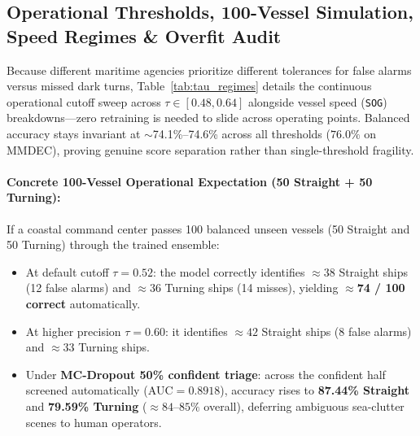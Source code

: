 \documentclass[11pt,a4paper]{article}
\begin{document}
\subsection{Operational Thresholds, 100-Vessel Simulation, Speed Regimes \& Overfit Audit}
Because different maritime agencies prioritize different tolerances for false alarms versus missed dark turns, Table~\ref{tab:tau_regimes} details the continuous operational cutoff sweep across $\tau \in [0.48, 0.64]$ alongside vessel speed (\texttt{SOG}) breakdowns---zero retraining is needed to slide across operating points. Balanced accuracy stays invariant at $\sim$74.1\%--74.6\% across all thresholds ($76.0\%$ on MMDEC), proving genuine score separation rather than single-threshold fragility.

\paragraph{Concrete 100-Vessel Operational Expectation (50 Straight + 50 Turning):}
If a coastal command center passes 100 balanced unseen vessels (50 Straight and 50 Turning) through the trained ensemble:
\begin{itemize}[leftmargin=1.5em]
    \item At default cutoff $\tau = 0.52$: the model correctly identifies $\approx 38$ Straight ships (12 false alarms) and $\approx 36$ Turning ships (14 misses), yielding \textbf{$\approx$74 / 100 correct} automatically.
    \item At higher precision $\tau = 0.60$: it identifies $\approx 42$ Straight ships (8 false alarms) and $\approx 33$ Turning ships.
    \item Under \textbf{MC-Dropout 50\% confident triage}: across the confident half screened automatically ($\text{AUC}=0.8918$), accuracy rises to \textbf{87.44\% Straight} and \textbf{79.59\% Turning} ($\approx 84$--$85\%$ overall), deferring ambiguous sea-clutter scenes to human operators.
\end{itemize}
\end{document}
